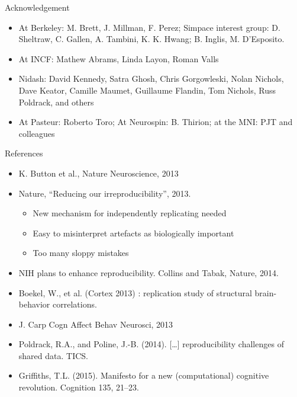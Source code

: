 \documentclass[ignorenonframetext,]{beamer}
\begin{document}
\begin{frame}{Acknowledgement}

\begin{itemize}
\itemsep1pt\parskip0pt
\item
  At Berkeley: M. Brett, J. Millman, F. Perez; Simpace interest group:
  D. Sheltraw, C. Gallen, A. Tambini, K. K. Hwang; B. Inglis, M.
  D'Esposito.
\item
  At INCF: Mathew Abrams, Linda Layon, Roman Valls
\item
  Nidash: David Kennedy, Satra Ghosh, Chris Gorgowleski, Nolan Nichols,
  Dave Keator, Camille Maumet, Guillaume Flandin, Tom Nichols, Russ
  Poldrack, and others
\item
  At Pasteur: Roberto Toro; At Neurospin: B. Thirion; at the MNI: PJT
  and colleagues
\end{itemize}

\end{frame}

\begin{frame}{References}

\begin{itemize}
\itemsep1pt\parskip0pt
\item
  K. Button et al., Nature Neuroscience, 2013
\item
  Nature, ``Reducing our irreproducibility'', 2013.

  \begin{itemize}
  \itemsep1pt\parskip0pt
  \item
    New mechanism for independently replicating needed
  \item
    Easy to misinterpret artefacts as biologically important
  \item
    Too many sloppy mistakes
  \end{itemize}
\item
  NIH plans to enhance reproducibility. Collins and Tabak, Nature, 2014.
\item
  Boekel, W., et al. (Cortex 2013) : replication study of structural
  brain-behavior correlations.
\item
  J. Carp Cogn Affect Behav Neurosci, 2013
\item
  Poldrack, R.A., and Poline, J.-B. (2014). {[}\ldots{}{]}
  reproducibility challenges of shared data. TICS.
\item
  Griffiths, T.L. (2015). Manifesto for a new (computational) cognitive
  revolution. Cognition 135, 21--23.
\end{itemize}

\end{frame}

\end{document}
